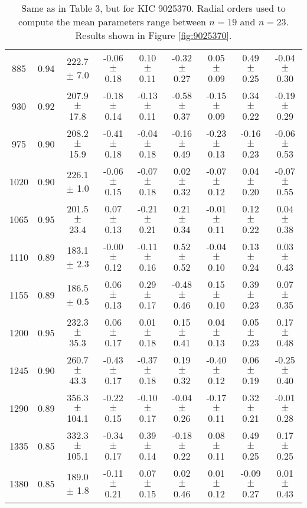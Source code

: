 \documentclass[twocolumn]{aastex61}%
\begin{document}
\begin{table*}[ht]
\begin{tabular}{ccc|ccccc|c}
885 & 0.94 & 222.7 $\pm$ 7.0 & -0.06 $\pm$ 0.18 & 0.10 $\pm$ 0.11 & -0.32 $\pm$ 0.27 & 0.05 $\pm$ 0.09 & 0.49 $\pm$ 0.25 & -0.04 $\pm$ 0.30\\
930 & 0.92 & 207.9 $\pm$ 17.8 & -0.18 $\pm$ 0.14 & -0.13 $\pm$ 0.11 & -0.58 $\pm$ 0.37 & -0.15 $\pm$ 0.09 & 0.34 $\pm$ 0.22 & -0.19 $\pm$ 0.29\\
975 & 0.90 & 208.2 $\pm$ 15.9 & -0.41 $\pm$ 0.18 & -0.04 $\pm$ 0.18 & -0.16 $\pm$ 0.49 & -0.23 $\pm$ 0.13 & -0.16 $\pm$ 0.23 & -0.06 $\pm$ 0.53\\
1020 & 0.90 & 226.1 $\pm$ 1.0 & -0.06 $\pm$ 0.15 & -0.07 $\pm$ 0.18 & 0.02 $\pm$ 0.32 & -0.07 $\pm$ 0.12 & 0.04 $\pm$ 0.20 & -0.07 $\pm$ 0.55\\
1065 & 0.95 & 201.5 $\pm$ 23.4 & 0.07 $\pm$ 0.13 & -0.21 $\pm$ 0.21 & 0.21 $\pm$ 0.34 & -0.01 $\pm$ 0.11 & 0.12 $\pm$ 0.22 & 0.04 $\pm$ 0.38\\
1110 & 0.89 & 183.1 $\pm$ 2.3 & -0.00 $\pm$ 0.12 & -0.11 $\pm$ 0.16 & 0.52 $\pm$ 0.52 & -0.04 $\pm$ 0.10 & 0.13 $\pm$ 0.24 & 0.03 $\pm$ 0.43\\
1155 & 0.89 & 186.5 $\pm$ 0.5 & 0.06 $\pm$ 0.13 & 0.29 $\pm$ 0.17 & -0.48 $\pm$ 0.46 & 0.15 $\pm$ 0.10 & 0.39 $\pm$ 0.23 & 0.07 $\pm$ 0.35\\
1200 & 0.95 & 232.3 $\pm$ 35.3 & 0.06 $\pm$ 0.17 & 0.01 $\pm$ 0.18 & 0.15 $\pm$ 0.41 & 0.04 $\pm$ 0.13 & 0.05 $\pm$ 0.23 & 0.17 $\pm$ 0.48\\
1245 & 0.90 & 260.7 $\pm$ 43.3 & -0.43 $\pm$ 0.17 & -0.37 $\pm$ 0.18 & 0.19 $\pm$ 0.32 & -0.40 $\pm$ 0.12 & 0.06 $\pm$ 0.19 & -0.25 $\pm$ 0.40\\
1290 & 0.89 & 356.3 $\pm$ 104.1 & -0.22 $\pm$ 0.15 & -0.10 $\pm$ 0.17 & -0.04 $\pm$ 0.26 & -0.17 $\pm$ 0.11 & 0.32 $\pm$ 0.21 & -0.01 $\pm$ 0.28\\
1335 & 0.85 & 332.3 $\pm$ 105.1 & -0.34 $\pm$ 0.17 & 0.39 $\pm$ 0.14 & -0.18 $\pm$ 0.22 & 0.08 $\pm$ 0.11 & 0.49 $\pm$ 0.25 & 0.17 $\pm$ 0.25\\
1380 & 0.85 & 189.0 $\pm$ 1.8 & -0.11 $\pm$ 0.21 & 0.07 $\pm$ 0.15 & 0.02 $\pm$ 0.46 & 0.01 $\pm$ 0.12 & -0.09 $\pm$ 0.27 & 0.01 $\pm$ 0.43\\
\end{tabular}
\caption{Same as in Table 3, but for KIC 9025370. Radial orders used to compute the mean parameters range between $n=19$ and $n=23$. Results shown in Figure \ref{fig:9025370}.}\label{tab:9025370}\vspace{-1.5cm}
\end{table*}
\end{document}
